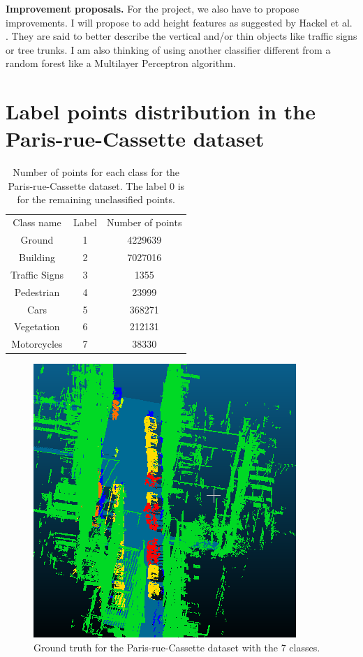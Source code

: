 \documentclass[a4paper, 11pt]{article}
\begin{document}
\textbf{Improvement proposals.} For the project, we also have to propose improvements. I will propose to  add height features as suggested by Hackel et al. \cite{hackel_fast_nodate}. They are said to better describe the vertical and/or thin objects like traffic signs or tree trunks. I am also thinking of using another classifier different from a random forest like a Multilayer Perceptron algorithm. 

\printbibliography

\appendix 
\section{Label points distribution in the Paris-rue-Cassette dataset}
\begin{table}[H]
    \centering
    \begin{tabular}{|c|c|c|}
        Class name & Label & Number of points \\
        Ground & 1 & 4229639\\ 
        Building & 2 & 7027016 \\ 
        Traffic Signs & 3 & 1355\\ 
        Pedestrian & 4 & 23999\\ 
        Cars & 5 & 368271\\ 
        Vegetation & 6 & 212131\\ 
        Motorcycles & 7 & 38330\\ 
    \end{tabular}
    \caption{Number of points for each class for the Paris-rue-Cassette dataset. The label 0 is for the remaining unclassified points.}
    \label{tab:classes}
\end{table}
\begin{figure}[H]
    \centering
    \includegraphics[width=\textwidth]{../Figures/GT_forClassification.png}
    \caption{Ground truth for the Paris-rue-Cassette dataset with the 7 classes.}
\end{figure}
\end{document}
